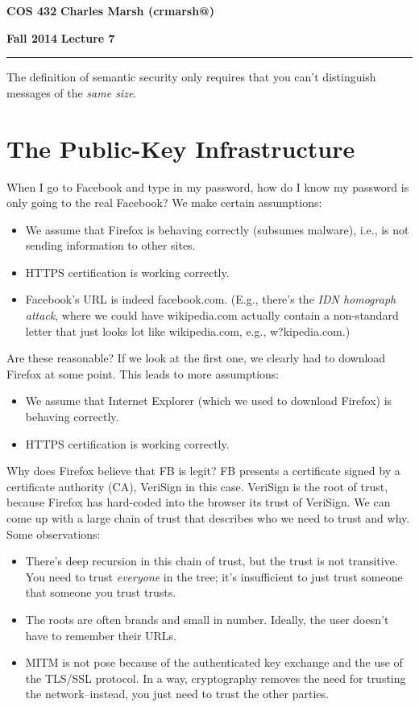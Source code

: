 \documentclass[12pt]{article}
\makeatletter
\newcommand{\myheader}[4]
{\vspace*{-0.5in}
\noindent
{#1} \hfill {#3}

\noindent
{#2} \hfill {#4}

\noindent
\rule[8pt]{\textwidth}{1pt}

\vspace{1ex} 
}  %
\newcommand{\myalgsheader}[0]
{\myheader
{ {\bf{COS 432}} }
{ {\bf{Fall 2014}} }
{ {\bf{Charles Marsh (crmarsh@)}} }
{ {\bf{Lecture 7}} }
}
\makeatother
\begin{document}
\myalgsheader

\pagestyle{plain}

The definition of semantic security only requires that you can't distinguish messages of the \textit{same size}.

\section*{The Public-Key Infrastructure}

When I go to Facebook and type in my password, how do I know my password is only going to the real Facebook? We make certain assumptions:
\begin{itemize}
\item We assume that Firefox is behaving correctly (subsumes malware), i.e., is not sending information to other sites.
\item HTTPS certification is working correctly.
\item Facebook's URL is indeed facebook.com. (E.g., there's the \textit{IDN homograph attack}, where we could have wikipedia.com actually contain a non-standard letter that just looks lot like wikipedia.com, e.g., w?kipedia.com.)
\end{itemize}

Are these reasonable? If we look at the first one, we clearly had to download Firefox at some point. This leads to more assumptions:
\begin{itemize}
\item We assume that Internet Explorer (which we used to download Firefox) is behaving correctly.
\item HTTPS certification is working correctly.
\end{itemize}

Why does Firefox believe that FB is legit? FB presents a certificate signed by a certificate authority (CA), VeriSign in this case. VeriSign is the root of trust, because Firefox has hard-coded into the browser its trust of VeriSign. We can come up with a large chain of trust that describes who we need to trust and why. Some observations:
\begin{itemize}
\item There's deep recursion in this chain of trust, but the trust is not transitive. You need to trust \textit{everyone} in the tree; it's insufficient to just trust someone that someone you trust trusts.
\item The roots are often brands and small in number. Ideally, the user doesn't have to remember their URLs.
\item MITM is not pose because of the authenticated key exchange and the use of the TLS/SSL protocol. In a way, cryptography removes the need for trusting the network--instead, you just need to trust the other parties.
\end{itemize}
\end{document}
